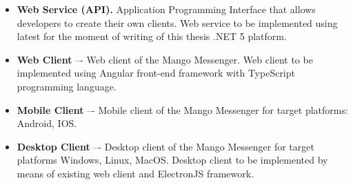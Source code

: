 \begin{enumerate}
\begin{itemize}
        \item \textbf{Web Service (API).} Application Programming Interface that allows developers to create their own clients.
        Web service to be implemented using latest for the moment of writing of this thesis .NET 5 platform.
        \item \textbf{Web Client} –- Web client of the Mango Messenger.
        Web client to be implemented using Angular front-end framework with TypeScript programming language.
        \item \textbf{Mobile Client} –- Mobile client of the Mango Messenger for target platforms: Android, IOS\@.
        \item \textbf{Desktop Client} –- Desktop client of the Mango Messenger for target platforms Windows, Linux, MacOS\@.
        Desktop client to be implemented by means of existing web client and ElectronJS framework.
    \end{itemize}
\end{enumerate}